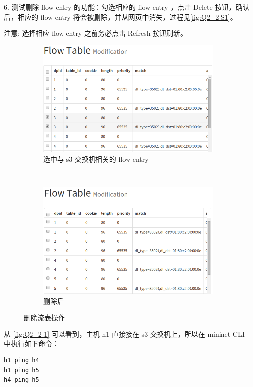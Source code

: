 \documentclass[format=draft,language=chinese,category=SDN]{hustreport}
\begin{document}
6. 测试删除 flow entry 的功能：勾选相应的 flow entry ，点击 Delete 按钮，确认后，相应的 flow entry 将会被删除，并从网页中消失，过程见\autoref{fig:Q2_2-S1}。

注意: 选择相应 flow entry 之前务必点击 Refresh 按钮刷新。

\begin{figure}[!h]
\centering
  \begin{subfigure}[b]{.48\textwidth}
  \includegraphics[width=\textwidth]{fig/2_2-4}
  \caption{选中与 s3 交换机相关的 flow entry}\label{fig:Q2_2-4}
  \end{subfigure}
  ~
  \begin{subfigure}[b]{.48\textwidth}
  \includegraphics[width=\textwidth]{fig/2_2-5}
  \caption{删除后}\label{fig:Q2_2-5}
  \end{subfigure}
\caption{删除流表操作}\label{fig:Q2_2-S1}
\end{figure}

从 \autoref{fig:Q2_2-1} 可以看到，主机 h1 直接接在 s3 交换机上，所以在 mininet CLI 中执行如下命令：
\begin{lstlisting}
h1 ping h4
h1 ping h5
h4 ping h5
\end{lstlisting}
\end{document}
